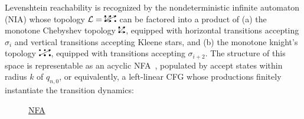 \documentclass[sigplan,review,anonymous,acmsmall]{acmart}\settopmatter{printfolios=false,printccs=false,printacmref=false}
\begin{document}
Levenshtein reachability is recognized by the nondeterministic infinite automaton (NIA) whose topology $\mathcal{L} = \knightkingarrow$ can be factored into a product of (a) the monotone Chebyshev topology $\kingarrow$, equipped with horizontal transitions accepting $\sigma_{i}$ and vertical transitions accepting Kleene stars, and (b) the monotone knight's topology $\knightarrow$, equipped with transitions accepting $\sigma_{i+2}$. The structure of this space is representable as an acyclic NFA~\cite{schulz2002fast}, populated by accept states within radius $k$ of $q_{n,0}$, or equivalently, a left-linear CFG whose productions finitely instantiate the transition dynamics:

\begin{figure}[H]
  \begin{minipage}[c]{0.45\textwidth}
    \centering
    \underline{NFA}\vspace{10pt}
\end{minipage}
\end{figure}
\end{document}
